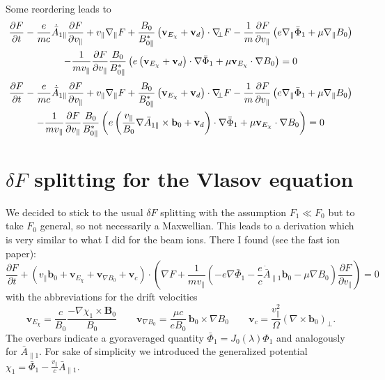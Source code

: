 Some reordering leads to 
\begin{multline*}
  \frac{\partial F}{\partial t}
  -\frac{e}{mc}\dot{\bar{A}}_{1\|}\frac{\partial F}{\partial v_\|}
  +v_\|\nabla_\| F
  +\frac{B_0}{B_{0\|}^*}\left(
    \mathbf{v}_{E_\chi}
    +\mathbf{v}_d
  \right)\cdot\nabla\!\!_\bot F
  -\frac{1}{m}\frac{\partial F}{\partial v_\|}\left(
    e\nabla_\|\bar{\Phi}_1
    +\mu\nabla_\| B_0
  \right)\\
  -\frac{1}{mv_\|}\frac{\partial F}{\partial v_\|}
  \frac{B_0}{B_{0\|}^*}\left(
    e\left(
      \mathbf{v}_{E_\chi}
      +\mathbf{v}_d
    \right)\cdot\nabla\bar{\Phi}_1
    +\mu\mathbf{v}_{E_\chi}\cdot\nabla B_0
  \right)
  =0
\end{multline*}
\begin{multline*}
  \frac{\partial F}{\partial t}
  -\frac{e}{mc}\dot{\bar{A}}_{1\|}\frac{\partial F}{\partial v_\|}
  +v_\|\nabla_\| F
  +\frac{B_0}{B_{0\|}^*}\left(
    \mathbf{v}_{E_\chi}
    +\mathbf{v}_d
  \right)\cdot\nabla\!\!_\bot F
  -\frac{1}{m}\frac{\partial F}{\partial v_\|}\left(
    e\nabla_\|\bar{\Phi}_1
    +\mu\nabla_\| B_0
  \right)\\
  -\frac{1}{mv_\|}\frac{\partial F}{\partial v_\|}
  \frac{B_0}{B_{0\|}^*}\left(
    e\left(
      \frac{v_\|}{B_0}\nabla\bar{A}_{1\|}\times\mathbf{b}_0
      +\mathbf{v}_d
    \right)\cdot\nabla\bar{\Phi}_1
    +\mu\mathbf{v}_{E_\chi}\cdot\nabla B_0
  \right)
  =0
\end{multline*}

\section{$\delta F$ splitting for the Vlasov equation}
\label{sec:vlasoveq}

We decided to stick to the usual $\delta F$ splitting with the
assumption $F_1\ll F_0$ but to take $F_0$ general, so not necessarily
a Maxwellian. This leads to a derivation which is very similar to what
I did for the beam ions. There I found (see the fast ion paper):
\begin{displaymath}
  \frac{\partial F}{\partial t}
  +\left(
    v_\|\mathbf{b}_0
    +\mathbf{v}_{E_\chi}
    +\mathbf{v}_{\nabla B_0}
    +\mathbf{v}_c
  \right)
  \cdot\left(
    \nabla F
    +\frac{1}{mv_\|}\left(
      -e\nabla\bar{\Phi}_1
      -\frac{e}{c}\dot{\bar{A}}_{\|1}\mathbf{b}_0
      -\mu\nabla B_0
    \right)\frac{\partial F}{\partial v_\|}
  \right)=0
\end{displaymath}
with the abbreviations for the drift velocities
\begin{displaymath}
  \mathbf{v}_{E_\chi}=\frac{c}{B_0}\frac{-\nabla
    \chi_1\times\mathbf{B}_0}{B_0}
  \qquad \mathbf{v}_{\nabla B_0} = \frac{\mu
    c}{eB_0}\,\mathbf{b}_0\times\nabla B_0
  \qquad \mathbf{v}_c = \frac{v_\|^2}{\Omega}(\nabla\times\mathbf{b}_0)_\bot.
\end{displaymath}
The overbars indicate a gyoraveraged quantity $\bar{\Phi}_1 =
J_0(\lambda)\Phi_1$ and analogously for $\bar{A}_{\|1}$.
For sake of simplicity we introduced the generalized potential
$\chi_1=\bar{\Phi}_1-\frac{v_\|}{c}\bar{A}_{\|1}$. 

